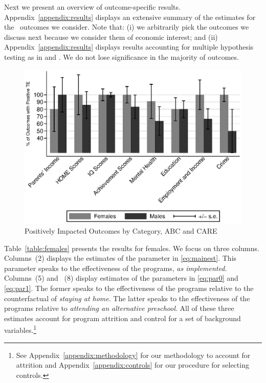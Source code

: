 \noindent Next we present an overview of outcome-specific results. Appendix~\ref{appendix:results} displays an extensive summary of the estimates for the \noutcomes\ outcomes we consider. Note that: (i) we arbitrarily pick the outcomes we discuss next because we consider them of economic interest; and (ii) Appendix~\ref{appendix:results} displays results accounting for multiple hypothesis testing as in \citet{Lehman_Romano_2005_AnnStat} and \citet{Romano_Shaikh_2006_AnnStat}. We do not lose significance in the majority of outcomes.

\begin{figure}[H]
		\caption{Positively Impacted Outcomes by Category, ABC and CARE} \label{fig:ppositivecategory1}
		\includegraphics[width=.8\columnwidth]{output/itt_noctrl_cats1.eps}
\end{figure}

\noindent Table~\ref{table:females} presents the results for females. We focus on three columns. Columns~(2) displays the estimates of the parameter in \eqref{eq:mainest}. This parameter speaks to the effectiveness of the programs, \textit{as implemented}. Columns~(5) and ~(8) display estimates of the parameters in \eqref{eq:par0} and \eqref{eq:par1}. The former speaks to the effectiveness of the programs relative to the counterfactual of \textit{staying at home}. The latter speaks to the effectiveness of the programs relative to \textit{attending an alternative preschool}. All of these three estimates account for program attrition and control for a set of background variables.\footnote{See Appendix~\ref{appendix:methodology} for our methodology to account for attrition and Appendix~\ref{appendix:controls} for our procedure for selecting controls.}\\

